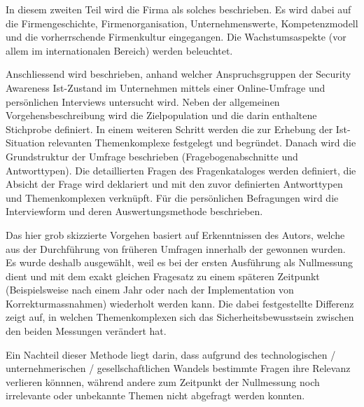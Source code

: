 \documentclass[../../main.tex]{subfiles}
\begin{document}
\begin{sloppypar}
In diesem zweiten Teil wird die Firma {\companylong} als solches beschrieben. Es wird dabei auf die Firmengeschichte, Firmenorganisation, Unternehmenswerte, Kompetenzmodell und die vorherrschende Firmenkultur eingegangen. Die Wachstumsaspekte (vor allem im internationalen Bereich) werden beleuchtet.

Anschliessend wird beschrieben, anhand welcher Anspruchsgruppen der Security Awareness Ist-Zustand im Unternehmen mittels einer Online-Umfrage und persönlichen Interviews untersucht wird. Neben der allgemeinen Vorgehensbeschreibung wird die Zielpopulation und die darin enthaltene Stichprobe definiert. In einem weiteren Schritt werden die zur Erhebung der Ist-Situation relevanten Themenkomplexe festgelegt und begründet. Danach wird die Grundstruktur der Umfrage beschrieben (Fragebogenabschnitte und Antworttypen). Die detaillierten Fragen des Fragenkataloges werden definiert, die Absicht der Frage wird deklariert und mit den zuvor definierten Antworttypen und Themenkomplexen verknüpft. Für die persönlichen Befragungen wird die Interviewform und deren Auswertungsmethode beschrieben.

Das hier grob skizzierte Vorgehen basiert auf Erkenntnissen des Autors, welche aus der Durchführung von früheren Umfragen innerhalb der {\companyshort} gewonnen wurden. Es wurde deshalb ausgewählt, weil es bei der ersten Ausführung als Nullmessung dient und mit dem exakt gleichen Fragesatz zu einem späteren Zeitpunkt (Beispielsweise nach einem Jahr oder nach der Implementation von Korrekturmassnahmen) wiederholt werden kann. Die dabei festgestellte Differenz zeigt auf, in welchen Themenkomplexen sich das Sicherheitsbewusstsein zwischen den beiden Messungen verändert hat.

Ein Nachteil dieser Methode liegt darin, dass aufgrund des technologischen / unternehmerischen / gesellschaftlichen Wandels bestimmte Fragen ihre Relevanz verlieren könnnen, während andere zum Zeitpunkt der Nullmessung noch irrelevante oder unbekannte Themen nicht abgefragt werden konnten.
\end{sloppypar}
\end{document}
